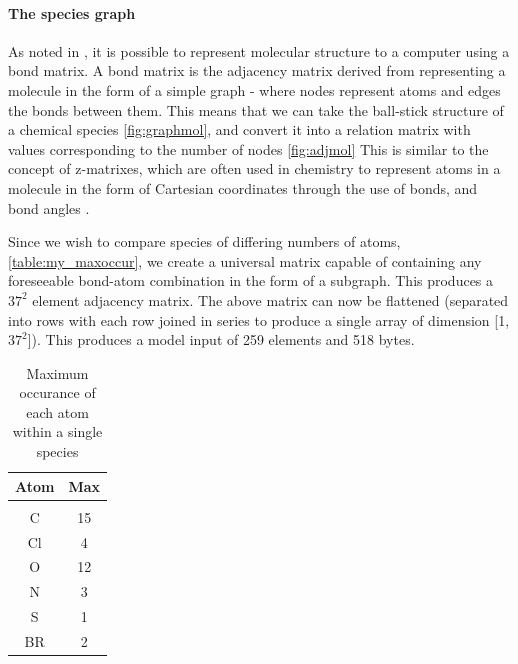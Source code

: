 \paragraph{The species graph}\label{sec:specgraph}

As noted in \citep{mcmgen}, it is possible to represent molecular structure to
a computer using a bond matrix. A bond matrix is the adjacency matrix derived from representing a molecule in the form of a simple graph - where nodes represent atoms and edges the bonds between them. This means that we can take the ball-stick structure of a chemical species \autoref{fig:graphmol}, and convert it into a relation matrix with values corresponding to the number of nodes \autoref{fig:adjmol} This is similar to the concept of z-matrixes, which are often used in chemistry to represent atoms in a molecule in the form of Cartesian coordinates through the use of bonds, and bond angles \citep{zmatrix}.

Since we wish to compare species of differing numbers of atoms, \autoref{table:my_maxoccur}, we create a universal matrix capable of containing any foreseeable bond-atom combination in the form of a subgraph. This produces a $37^2$ element adjacency matrix. The above matrix can now be flattened (separated into rows with each row joined in series to produce a single array of dimension [1,$37^2$]). This produces a model input of 259 elements and 518 bytes.


\begin{table}[h]
    \centering
    \begin{tabular}{c|c}
    \textbf{Atom} & \textbf{Max}\\\hline
    &\\
        C & 15 \\
        Cl & 4 \\
        O & 12\\
        N&3\\
        S&1\\
        BR&2
    \end{tabular}
    \caption{Maximum occurance of each atom within a single species}
    \label{table:my_maxoccur}
\end{table}



